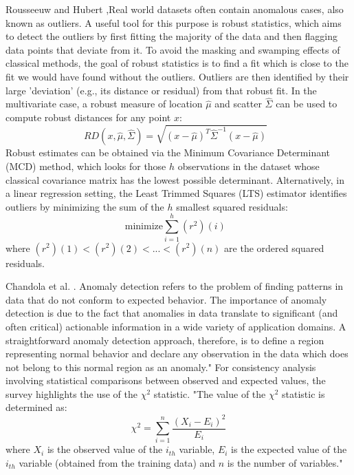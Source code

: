 Rousseeuw and Hubert \cite{rousseeuw_anomaly_2018},Real world datasets often contain anomalous cases, also known as outliers. A useful tool for this purpose is robust statistics, which aims to detect the outliers by first fitting the majority of the data and then flagging data points that deviate from it. To avoid the masking and swamping effects of classical methods, the goal of robust statistics is to find a fit which is close to the fit we would have found without the outliers. Outliers are then identified by their large 'deviation' (e.g., its distance or residual) from that robust fit. In the multivariate case, a robust measure of location $\hat{\mu}$ and scatter $\hat{\Sigma}$ can be used to compute robust distances for any point $x$:
\begin{equation}
	RD(x,\hat{\mu},\hat{\Sigma})=\sqrt{(x-\hat{\mu})^{T}\hat{\Sigma}^{-1}(x-\hat{\mu})} \text{ }
\end{equation}
Robust estimates can be obtained via the Minimum Covariance Determinant (MCD) method, which looks for those $h$ observations in the dataset whose classical covariance matrix has the lowest possible determinant. Alternatively, in a linear regression setting, the Least Trimmed Squares (LTS) estimator identifies outliers by minimizing the sum of the $h$ smallest squared residuals:
\begin{equation}
	\text{minimize} \sum_{i=1}^{h} (r^{2}){(i)} \text{ }
\end{equation}
where $(r^{2}){(1)} < (r^{2}){(2)} < ... < (r^{2}){(n)}$ are the ordered squared residuals.



Chandola et al. \cite{chandola_anomaly_2009}. Anomaly detection refers to the problem of finding patterns in data that do not conform to expected behavior. The importance of anomaly detection is due to the fact that anomalies in data translate to significant (and often critical) actionable information in a wide variety of application domains. A straightforward anomaly detection approach, therefore, is to define a region representing normal behavior and declare any observation in the data which does not belong to this normal region as an anomaly." For consistency analysis involving statistical comparisons between observed and expected values, the survey highlights the use of the $\chi^{2}$ statistic. "The value of the $\chi^{2}$ statistic is determined as:
\begin{equation}
	\chi^{2}=\sum_{i=1}^{n}\frac{(X_{i}-E_{i})^{2}}{E_{i}}
\end{equation}
where $X_{i}$ is the observed value of the $i_{th}$ variable, $E_{i}$ is the expected value of the $i_{th}$ variable (obtained from the training data) and $n$ is the number of variables."

